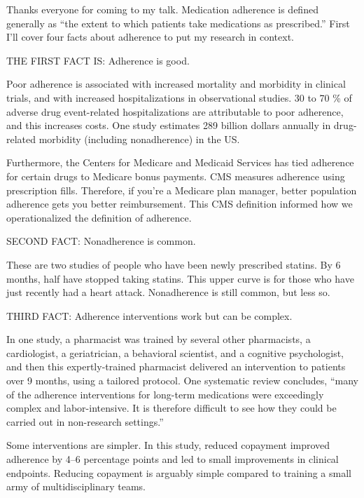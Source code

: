\documentclass[12pt]{report}
\begin{document}
\begin{large}

Thanks everyone for coming to my talk. Medication adherence is defined
generally as ``the extent to which patients take medications as
prescribed.'' First I'll cover four facts about adherence to put my
research in context. %

THE FIRST FACT IS: Adherence is good. %

Poor adherence is associated with increased mortality and morbidity in
clinical trials, and with increased hospitalizations in observational
studies. 30 to 70 \% of adverse drug event-related hospitalizations
are attributable to poor adherence, and this increases costs. One
study estimates 289 billion dollars annually in drug-related morbidity
(including nonadherence) in the US. %

Furthermore, the Centers for Medicare and Medicaid Services has tied
adherence for certain drugs to Medicare bonus payments. CMS measures
adherence using prescription fills. Therefore, if you're a Medicare
plan manager, better population adherence gets you better
reimbursement. This CMS definition informed how we operationalized the
definition of adherence. %

SECOND FACT: Nonadherence is common. %

These are two studies of people who have been newly prescribed
statins. By 6 months, half have stopped taking statins. This upper
curve is for those who have just recently had a heart attack.
Nonadherence is still common, but less so. %

THIRD FACT: Adherence interventions work but can be complex. %

In one study, a pharmacist was trained by several other pharmacists, a
cardiologist, a geriatrician, a behavioral scientist, and a cognitive
psychologist, and then this expertly-trained pharmacist delivered an
intervention to patients over 9 months, using a tailored protocol. One
systematic review concludes, ``many of the adherence interventions for
long-term medications were exceedingly complex and labor-intensive. It
is therefore difficult to see how they could be carried out in
non-research settings.''

Some interventions are simpler. In this study, reduced copayment
improved adherence by 4--6 percentage points and led to small
improvements in clinical endpoints. Reducing copayment is arguably
simple compared to training a small army of multidisciplinary teams.


\end{large}
\end{document}
